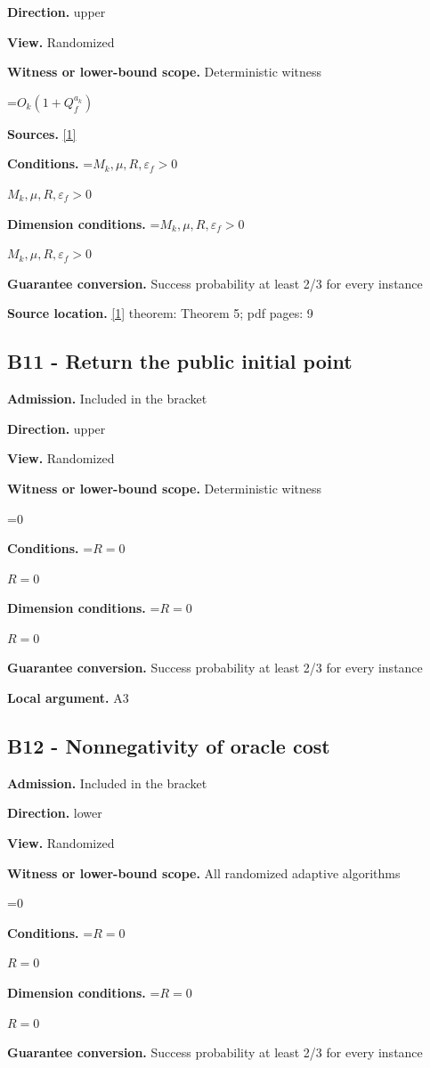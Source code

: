 \documentclass[10pt,a4paper]{article}
\newcommand{\AtlasMath}[1]{\par\begingroup\centering\setbox0=\hbox{$\displaystyle #1$}\ifdim\wd0>1.4\linewidth\typeout{ATLAS WIDE FORMULA: \the\wd0}\fi\ifdim\wd0>\linewidth\resizebox{\linewidth}{!}{\box0}\else\box0\fi\par\endgroup}
\newcommand{\AtlasInlineMath}[1]{\begingroup\setbox0=\hbox{$#1$}\ifdim\wd0>.4\linewidth\endgroup\AtlasMath{#1}\else\endgroup$#1$\fi}
\begin{document}
\textbf{Direction.} upper

\textbf{View.} Randomized

\textbf{Witness or lower-bound scope.} Deterministic witness

\AtlasMath{O_k(1+Q_f^{a_k})}
\textbf{Sources.} \href{https://arxiv.org/pdf/2205.09647v1}{[1]}

\textbf{Conditions.} \AtlasInlineMath{M_k,\mu,R,\varepsilon_f>0}

\textbf{Dimension conditions.} \AtlasInlineMath{M_k,\mu,R,\varepsilon_f>0}

\textbf{Guarantee conversion.} Success probability at least 2/3 for every instance

\textbf{Source location.} \href{https://arxiv.org/pdf/2205.09647v1}{[1]} theorem: Theorem 5; pdf pages: 9

\subsection{B11 - Return the public initial point}
\textbf{Admission.} Included in the bracket

\textbf{Direction.} upper

\textbf{View.} Randomized

\textbf{Witness or lower-bound scope.} Deterministic witness

\AtlasMath{0}
\textbf{Conditions.} \AtlasInlineMath{R=0}

\textbf{Dimension conditions.} \AtlasInlineMath{R=0}

\textbf{Guarantee conversion.} Success probability at least 2/3 for every instance

\textbf{Local argument.} A3

\subsection{B12 - Nonnegativity of oracle cost}
\textbf{Admission.} Included in the bracket

\textbf{Direction.} lower

\textbf{View.} Randomized

\textbf{Witness or lower-bound scope.} All randomized adaptive algorithms

\AtlasMath{0}
\textbf{Conditions.} \AtlasInlineMath{R=0}

\textbf{Dimension conditions.} \AtlasInlineMath{R=0}

\textbf{Guarantee conversion.} Success probability at least 2/3 for every instance
\end{document}
